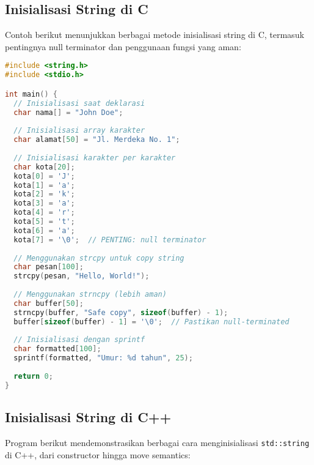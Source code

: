 \documentclass[../main.tex]{subfiles}
\begin{document}
\subsection{Inisialisasi String di C}

Contoh berikut menunjukkan berbagai metode inisialisasi string di C, termasuk pentingnya null terminator dan penggunaan fungsi yang aman:

\begin{lstlisting}[language=C, caption={Inisialisasi string di C}]
#include <string.h>
#include <stdio.h>

int main() {
  // Inisialisasi saat deklarasi
  char nama[] = "John Doe";
  
  // Inisialisasi array karakter
  char alamat[50] = "Jl. Merdeka No. 1";
  
  // Inisialisasi karakter per karakter
  char kota[20];
  kota[0] = 'J';
  kota[1] = 'a';
  kota[2] = 'k';
  kota[3] = 'a';
  kota[4] = 'r';
  kota[5] = 't';
  kota[6] = 'a';
  kota[7] = '\0';  // PENTING: null terminator
  
  // Menggunakan strcpy untuk copy string
  char pesan[100];
  strcpy(pesan, "Hello, World!");
  
  // Menggunakan strncpy (lebih aman)
  char buffer[50];
  strncpy(buffer, "Safe copy", sizeof(buffer) - 1);
  buffer[sizeof(buffer) - 1] = '\0';  // Pastikan null-terminated
  
  // Inisialisasi dengan sprintf
  char formatted[100];
  sprintf(formatted, "Umur: %d tahun", 25);
  
  return 0;
}
\end{lstlisting}

\subsection{Inisialisasi String di C++}

Program berikut mendemonstrasikan berbagai cara menginisialisasi \texttt{std::string} di C++, dari constructor hingga move semantics:
\end{document}
